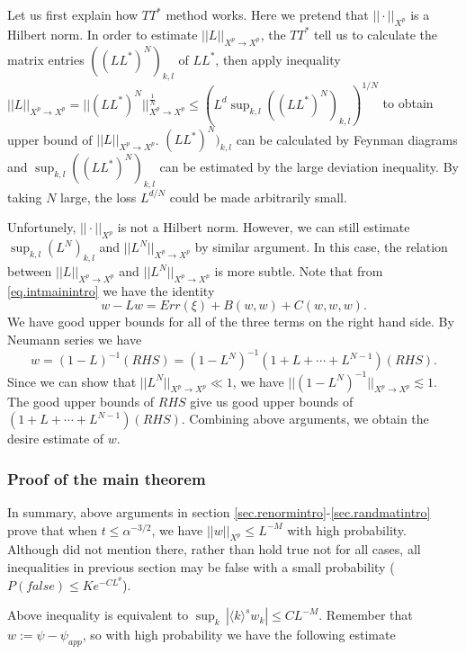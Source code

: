 Let us first explain how $TT^*$ method works. Here we pretend that $||\cdot||_{X^p}$ is a Hilbert norm. In order to estimate $||L||_{X^p\rightarrow X^p}$, the $TT^*$ tell us to calculate the matrix entries $((LL^*)^N)_{k,l}$ of $LL^*$, then apply inequality $||L||_{X^p\rightarrow X^p}=||(LL^*)^N||_{X^p\rightarrow X^p}^{\frac{1}{N}}\le (L^d\sup_{k,l} ((LL^*)^N)_{k,l})^{1/N}$ to obtain upper bound of $||L||_{X^p\rightarrow X^p}$. $(LL^*)^N)_{k,l}$ can be calculated by Feynman diagrams and $\sup_{k,l} ((LL^*)^N)_{k,l}$ can be estimated by the large deviation inequality. By taking $N$ large, the loss $L^{d/N}$ could be made arbitrarily small.

Unfortunely, $||\cdot||_{X^p}$ is not a Hilbert norm. However, we can still estimate $\sup_{k,l} (L^N)_{k,l}$ and $||L^N||_{X^p\rightarrow X^p}$ by similar argument. In this case, the relation between $||L||_{X^p\rightarrow X^p}$ and $||L^N||_{X^p\rightarrow X^p}$ is more subtle. Note that from \eqref{eq.intmainintro} we have the identity
\begin{equation}
    w-Lw= Err(\xi)+B(w,w)+C(w,w,w).
\end{equation}
We have good upper bounds for all of the three terms on the right hand side. By Neumann series we have
\begin{equation}
    w= (1-L)^{-1}(\textit{RHS}) =(1-L^N)^{-1}(1+L+\cdots+L^{N-1})(\textit{RHS}).
\end{equation}
Since we can show that $||L^N||_{X^p\rightarrow X^p}\ll 1$, we have $||(1-L^N)^{-1}||_{X^p\rightarrow X^p}\lesssim 1$. The good upper bounds of $\textit{RHS}$ give us good upper bounds of $(1+L+\cdots+L^{N-1})(\textit{RHS})$. Combining above arguments, we obtain the desire estimate of $w$.

\subsubsection{Proof of the main theorem} In summary, above arguments in section \ref{sec.renormintro}-\ref{sec.randmatintro} prove that when $t\le \alpha^{-3/2}$, we have $||w||_{X^p}\le L^{-M}$ with high probability. Although did not mention there, rather than hold true not for all cases, all inequalities in previous section may be false with a small probability ($P(\textit{false})\le Ke^{-CL^{\theta}}$).   


Above inequality is equivalent to $\sup_k\, |\langle k \rangle^s w_k|\le CL^{-M}$. Remember that $w:=\psi-\psi_{app}$, so with high probability we have the following estimate

